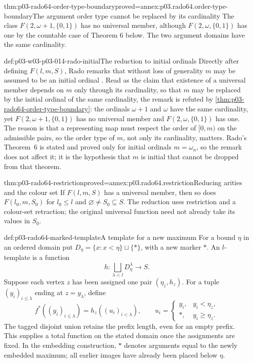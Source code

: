 \begin{hbtheorem}{thm:p03-rado64-order-type-boundary}{proved=annex:p03.rado64.order-type-boundary}{The argument order type cannot be replaced by its cardinality}
The class \(F(2,\omega+1,\{0,1\})\) has no universal member,
although \(F(2,\omega,\{0,1\})\) has one by the countable case
of Theorem 6 below. The two argument domains have the same cardinality.
\end{hbtheorem}

\begin{hbwarning}{def:p03-w03-p03-014-rado-initial}{The reduction to initial ordinals}
Directly after defining \(F(l,m,S)\), Rado remarks that without loss of
generality \(m\) may be assumed to be an initial ordinal
\cite[\S4.2, p.~337]{Rado1964}. Read as the claim that existence of a
universal member depends on \(m\) only through its cardinality, so that
\(m\) may be replaced by the initial ordinal of the same cardinality, the
remark is refuted by \cref{thm:p03-rado64-order-type-boundary}: the
ordinals \(\omega+1\) and \(\omega\) have the same cardinality, yet
\(F(2,\omega+1,\{0,1\})\) has no universal member and
\(F(2,\omega,\{0,1\})\) has one. The reason is that a representing map
must respect the order of \([0,m)\) on the admissible pairs, so the order
type of \(m\), not only its cardinality, matters. Rado's Theorem~6 is
stated and proved only for initial ordinals \(m=\omega_n\), so the
remark does not affect it; it is the hypothesis that \(m\) is initial
that cannot be dropped from that theorem.
\end{hbwarning}

\begin{hbtheorem}{thm:p03-rado64-restriction}{proved=annex:p03.rado64.restriction}{Reducing arities and the colour set}
If \(F(l,m,S)\) has a universal member, then so does
\(F(l_0,m,S_0)\) for \(l_0\leq l\) and
\(\varnothing\ne S_0\subseteq S\).
The reduction uses restriction and a colour-set retraction; the original
universal function need not already take its values in \(S_0\).
\end{hbtheorem}

\begin{hbdefinition}{def:p03-rado64-marked-template}{A template for a new maximum}
For a bound \(\eta\) in an ordered domain put
\(D_\eta=\{x:x<\eta\}\sqcup\{*\}\), with a new marker \(*\).
An \(l\)-template is a function
\[
 h:\bigsqcup_{\lambda<l}D_\eta^\lambda\longrightarrow S.
\]
Suppose each vertex \(z\) has been assigned one pair \((\eta_z,h_z)\).
For a tuple \((y_i)_{i\leq\lambda}\) ending at \(z=y_\lambda\), define
\[
 f^*((y_i)_{i\leq\lambda})=h_z((u_i)_{i<\lambda}),\qquad
 u_i=\begin{cases}y_i,&y_i<\eta_z,\\ *,&y_i\geq\eta_z.\end{cases}
\]
The tagged disjoint union retains the prefix length, even for an empty
prefix. This supplies a total function on the stated domain once the
assignments are fixed.
In the embedding construction, \(*\) denotes arguments equal to the newly
embedded maximum; all earlier images have already been placed below \(\eta\).
\end{hbdefinition}

